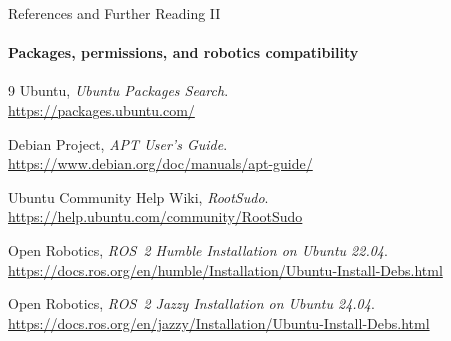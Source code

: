 \begin{frame}{References and Further Reading II}
\framesubtitle{Packages, permissions, and robotics compatibility}

\scriptsize
\begin{thebibliography}{9}
    Ubuntu, \emph{Ubuntu Packages Search}.\\
    \url{https://packages.ubuntu.com/}

    Debian Project, \emph{APT User's Guide}.\\
    \url{https://www.debian.org/doc/manuals/apt-guide/}

    Ubuntu Community Help Wiki, \emph{RootSudo}.\\
    \url{https://help.ubuntu.com/community/RootSudo}

    Open Robotics, \emph{ROS~2 Humble Installation on Ubuntu 22.04}.\\
    \url{https://docs.ros.org/en/humble/Installation/Ubuntu-Install-Debs.html}

    Open Robotics, \emph{ROS~2 Jazzy Installation on Ubuntu 24.04}.\\
    \url{https://docs.ros.org/en/jazzy/Installation/Ubuntu-Install-Debs.html}
\end{thebibliography}
\end{frame}